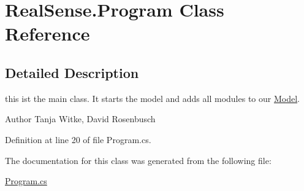 \hypertarget{class_real_sense_1_1_program}{}\section{Real\+Sense.\+Program Class Reference}
\label{class_real_sense_1_1_program}


\subsection{Detailed Description}
this ist the main class. It starts the model and adds all modules to our \hyperlink{class_real_sense_1_1_model}{Model}.

\begin{DoxyAuthor}{Author}
Tanja Witke, David Rosenbusch 
\end{DoxyAuthor}


Definition at line 20 of file Program.\+cs.



The documentation for this class was generated from the following file\+:\begin{DoxyCompactItemize}
\item 
\hyperlink{_program_8cs}{Program.\+cs}\end{DoxyCompactItemize}
